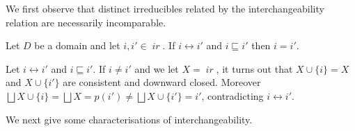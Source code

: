 \documentclass[conference]{IEEEtran}
\renewenvironment{proof}{\begin{IEEEproof}}{\end{IEEEproof}}
\newcommand{\ir}[1]{\ensuremath{\mathop{\mathit{ir}({#1})}}}
\newcommand{\pred}[1]{\ensuremath{\mathit{p}({#1})}}
\begin{document}

  



We first observe that distinct irreducibles related by the
interchangeability relation are necessarily incomparable.
  

\begin{lemma}
  \label{le:inter-ord}
  Let $D$ be a domain and let $i, i' \in \ir{D}$.
  If $i \leftrightarrow i'$ and $i \sqsubseteq i'$ then $i=i'$.
\end{lemma}

\begin{proof}

  Let $i \leftrightarrow i'$ and $i \sqsubseteq i'$. 
  If $i \neq i'$ and we let
  $X = \ir{\pred{i'}}$, it turns out that $X \cup \{i\} = X$ and
  $X \cup \{i'\}$ are consistent and downward closed. Moreover
  $\bigsqcup X \cup \{i\} = \bigsqcup X = \pred{i'} \neq \bigsqcup X
  \cup \{i'\} = i'$, contradicting $i \leftrightarrow i'$.
\end{proof}

We next give some characterisations of interchangeability.
\end{document}
